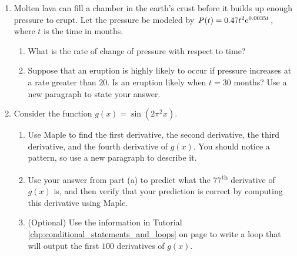 \begin{enumerate}
    \item Molten lava can fill a chamber in the earth's crust before it builds up enough pressure to erupt. Let the pressure be modeled by $P(t) = 0.47 t^2 {\rm e}^{0.0035 t}$, where $t$ is the time in months.
    \begin{enumerate}
    	\item What is the rate of change of pressure with respect to time?
    	\item Suppose that an eruption is highly likely to occur if pressure increases at a rate greater than $20$. Is an eruption likely when $t=30$ months? Use a new paragraph to state your answer.
    \end{enumerate}
    \newpage
	\item Consider the function $g(x)=\sin(2\pi^2 x)$.
	\begin{enumerate}
	\item Use Maple to find the first derivative, the second derivative, the third derivative, and the fourth derivative of $g(x)$. You should notice a pattern, so use a new paragraph to describe it.
	\item Use your answer from part (a) to predict what the $77$\textsuperscript{th} derivative of $g(x)$ is, and then verify that your prediction is correct by computing this derivative using Maple.
	\item (Optional) Use the information in Tutorial \ref{chp:conditional_statements_and_loops} on page \pageref{chp:conditional_statements_and_loops} to write a loop that will output the first $100$ derivatives of $g(x)$.
	\end{enumerate}
\end{enumerate}

